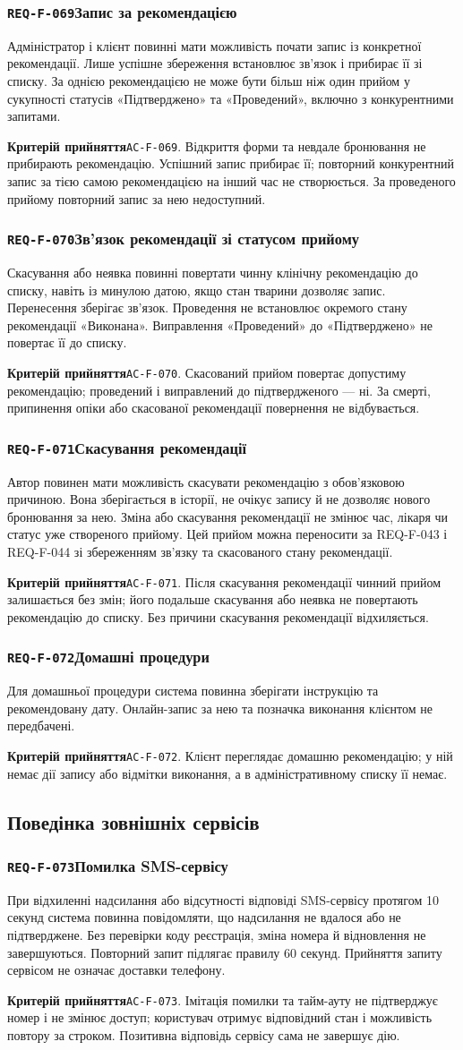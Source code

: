 \documentclass[11pt,a4paper]{article}
\newcommand{\requirement}[4]{%
  \Needspace{7\baselineskip}%
  \subsubsection*{\hypertarget{#1}{\texttt{#1}}\quad #2}%
  #3\par
  \textbf{Критерій прийняття}\quad #4\par\medskip}
\begin{document}
\requirement{REQ-F-069}{Запис за рекомендацією}{Адміністратор і клієнт повинні мати можливість почати запис із конкретної рекомендації. Лише успішне збереження встановлює зв’язок і прибирає її зі списку. За однією рекомендацією не може бути більш ніж один прийом у сукупності статусів «Підтверджено» та «Проведений», включно з конкурентними запитами.}{\hypertarget{AC-F-069}{\texttt{AC-F-069}}. Відкриття форми та невдале бронювання не прибирають рекомендацію. Успішний запис прибирає її; повторний конкурентний запис за тією самою рекомендацією на інший час не створюється. За проведеного прийому повторний запис за нею недоступний.}

\requirement{REQ-F-070}{Зв’язок рекомендації зі статусом прийому}{Скасування або неявка повинні повертати чинну клінічну рекомендацію до списку, навіть із минулою датою, якщо стан тварини дозволяє запис. Перенесення зберігає зв’язок. Проведення не встановлює окремого стану рекомендації «Виконана». Виправлення «Проведений» до «Підтверджено» не повертає її до списку.}{\hypertarget{AC-F-070}{\texttt{AC-F-070}}. Скасований прийом повертає допустиму рекомендацію; проведений і виправлений до підтвердженого — ні. За смерті, припинення опіки або скасованої рекомендації повернення не відбувається.}

\requirement{REQ-F-071}{Скасування рекомендації}{Автор повинен мати можливість скасувати рекомендацію з обов’язковою причиною. Вона зберігається в історії, не очікує запису й не дозволяє нового бронювання за нею. Зміна або скасування рекомендації не змінює час, лікаря чи статус уже створеного прийому. Цей прийом можна переносити за REQ-F-043 і REQ-F-044 зі збереженням зв’язку та скасованого стану рекомендації.}{\hypertarget{AC-F-071}{\texttt{AC-F-071}}. Після скасування рекомендації чинний прийом залишається без змін; його подальше скасування або неявка не повертають рекомендацію до списку. Без причини скасування рекомендації відхиляється.}

\requirement{REQ-F-072}{Домашні процедури}{Для домашньої процедури система повинна зберігати інструкцію та рекомендовану дату. Онлайн-запис за нею та позначка виконання клієнтом не передбачені.}{\hypertarget{AC-F-072}{\texttt{AC-F-072}}. Клієнт переглядає домашню рекомендацію; у ній немає дії запису або відмітки виконання, а в адміністративному списку її немає.}

\subsection{Поведінка зовнішніх сервісів}
\requirement{REQ-F-073}{Помилка SMS-сервісу}{При відхиленні надсилання або відсутності відповіді SMS-сервісу протягом 10 секунд система повинна повідомляти, що надсилання не вдалося або не підтверджене. Без перевірки коду реєстрація, зміна номера й відновлення не завершуються. Повторний запит підлягає правилу 60 секунд. Прийняття запиту сервісом не означає доставки телефону.}{\hypertarget{AC-F-073}{\texttt{AC-F-073}}. Імітація помилки та тайм-ауту не підтверджує номер і не змінює доступ; користувач отримує відповідний стан і можливість повтору за строком. Позитивна відповідь сервісу сама не завершує дію.}
\end{document}
